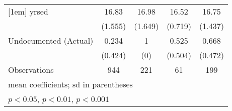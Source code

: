 \begin{table}[htbp]
\begin{tabular}{l*{4}{c}}
[1em]
yrsed               &       16.83         &       16.98         &       16.52         &       16.75         \\
                    &     (1.555)         &     (1.649)         &     (0.719)         &     (1.437)         \\
[1em]
Undocumented (Actual)&       0.234         &           1         &       0.525         &       0.668         \\
                    &     (0.424)         &         (0)         &     (0.504)         &     (0.472)         \\
\hline
Observations        &         944         &         221         &          61         &         199         \\
\hline\hline
\multicolumn{5}{l}{\footnotesize mean coefficients; sd in parentheses}\\
\multicolumn{5}{l}{\footnotesize \sym{*} \(p<0.05\), \sym{**} \(p<0.01\), \sym{***} \(p<0.001\)}\\
\end{tabular}
\end{table}
